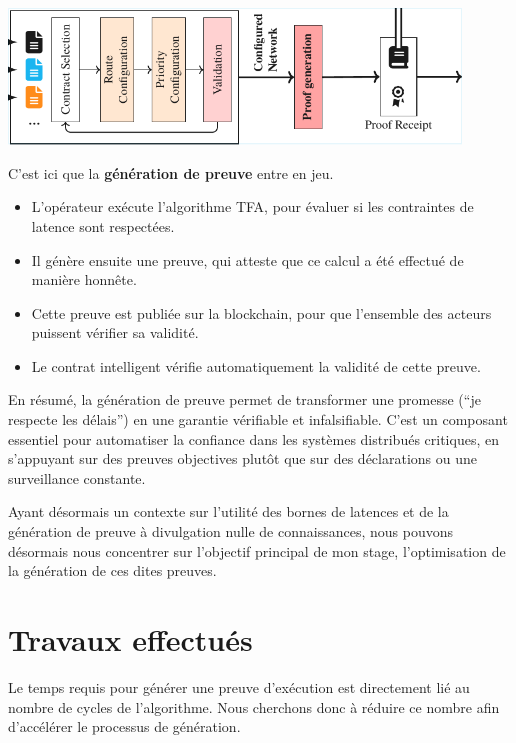 \documentclass[12pt]{report}
\begin{document}
\bigskip

\begin{center}
  \includegraphics[width=0.9\textwidth]{main_cropped.pdf}
\end{center}

C'est ici que la \textbf{génération de preuve} entre en jeu.

\begin{itemize}
    \item L'opérateur exécute l'algorithme TFA, pour évaluer si les contraintes de latence sont respectées.
    \item Il génère ensuite une preuve, qui atteste que ce calcul a été effectué de manière honnête.
    \item Cette preuve est publiée sur la blockchain, pour que l'ensemble des acteurs puissent vérifier sa validité.
    \item Le contrat intelligent vérifie automatiquement la validité de cette preuve.
\end{itemize}

\medskip

En résumé, la génération de preuve permet de transformer une promesse (``je respecte les délais'') en une garantie vérifiable et infalsifiable. C'est un composant essentiel pour automatiser la confiance dans les systèmes distribués critiques, en s'appuyant sur des preuves objectives plutôt que sur des déclarations ou une surveillance constante.

\medskip

Ayant désormais un contexte sur l'utilité des bornes de latences
et de la génération de preuve à divulgation nulle de connaissances,
nous pouvons désormais nous concentrer sur l'objectif principal de
mon stage, l'optimisation de la génération de ces dites preuves.

\chapter{Travaux effectués}

Le temps requis pour générer une preuve d'exécution est directement lié au nombre
de cycles de l'algorithme.
Nous cherchons donc à réduire ce nombre afin d'accélérer le processus de
génération.
\end{document}
